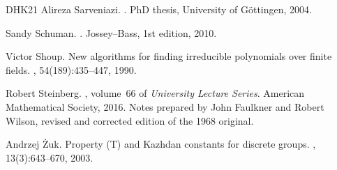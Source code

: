 \documentclass[10pt,a4paper]{article}
\theoremstyle{definition}
\begin{document}
\begin{thebibliography}{DHK{\etalchar{+}}21}
Alireza Sarveniazi.
.
\newblock PhD thesis, University of G{\"o}ttingen, 2004.

Sandy Schuman.
.
\newblock Jossey--Bass, 1st edition, 2010.

Victor Shoup.
\newblock New algorithms for finding irreducible polynomials over finite
  fields.
, 54(189):435--447, 1990.

Robert Steinberg.
, volume~66 of {\em University
  Lecture Series}.
\newblock American Mathematical Society, 2016.
\newblock Notes prepared by John Faulkner and Robert Wilson, revised and
  corrected edition of the 1968 original.

Andrzej {\.Z}uk.
\newblock Property ({T}) and {K}azhdan constants for discrete groups.
, 13(3):643--670, 2003.

\end{thebibliography}
\end{document}

